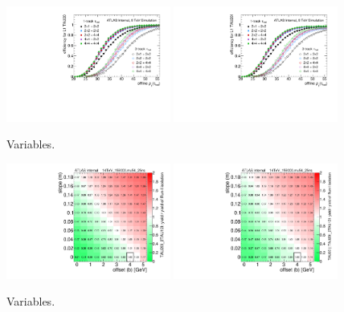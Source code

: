 \begin{figure}[tp]
  \centering
  \includegraphics[width=0.48\textwidth]{figures/trigger/turnon_L1TAU20_1p3p}
  \includegraphics[width=0.48\textwidth]{figures/trigger/turnon_L1TAU20I_1p3p}
  \caption{Variables.}
  \label{fig:prospects-trigger-towersize}
\end{figure}

\begin{figure}[tp]
  \centering
  \includegraphics[width=0.48\textwidth]{figures/trigger/iso_background_noTAU60}
  \includegraphics[width=0.48\textwidth]{figures/trigger/iso_background_yesTAU60}
  \caption{Variables.}
  \label{fig:prospects-trigger-isolation-rate}
\end{figure}

